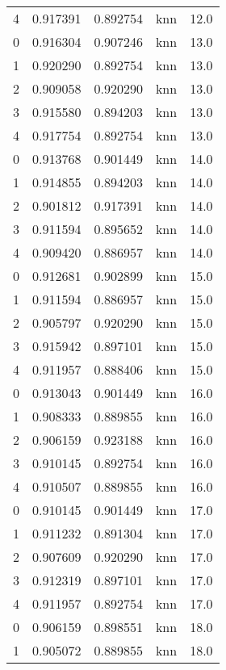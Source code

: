 \begin{tabular}{rrrlr}
     4 & 0.917391 & 0.892754 &      knn &       12.0 \\
     0 & 0.916304 & 0.907246 &      knn &       13.0 \\
     1 & 0.920290 & 0.892754 &      knn &       13.0 \\
     2 & 0.909058 & 0.920290 &      knn &       13.0 \\
     3 & 0.915580 & 0.894203 &      knn &       13.0 \\
     4 & 0.917754 & 0.892754 &      knn &       13.0 \\
     0 & 0.913768 & 0.901449 &      knn &       14.0 \\
     1 & 0.914855 & 0.894203 &      knn &       14.0 \\
     2 & 0.901812 & 0.917391 &      knn &       14.0 \\
     3 & 0.911594 & 0.895652 &      knn &       14.0 \\
     4 & 0.909420 & 0.886957 &      knn &       14.0 \\
     0 & 0.912681 & 0.902899 &      knn &       15.0 \\
     1 & 0.911594 & 0.886957 &      knn &       15.0 \\
     2 & 0.905797 & 0.920290 &      knn &       15.0 \\
     3 & 0.915942 & 0.897101 &      knn &       15.0 \\
     4 & 0.911957 & 0.888406 &      knn &       15.0 \\
     0 & 0.913043 & 0.901449 &      knn &       16.0 \\
     1 & 0.908333 & 0.889855 &      knn &       16.0 \\
     2 & 0.906159 & 0.923188 &      knn &       16.0 \\
     3 & 0.910145 & 0.892754 &      knn &       16.0 \\
     4 & 0.910507 & 0.889855 &      knn &       16.0 \\
     0 & 0.910145 & 0.901449 &      knn &       17.0 \\
     1 & 0.911232 & 0.891304 &      knn &       17.0 \\
     2 & 0.907609 & 0.920290 &      knn &       17.0 \\
     3 & 0.912319 & 0.897101 &      knn &       17.0 \\
     4 & 0.911957 & 0.892754 &      knn &       17.0 \\
     0 & 0.906159 & 0.898551 &      knn &       18.0 \\
     1 & 0.905072 & 0.889855 &      knn &       18.0 \\

\end{tabular}
